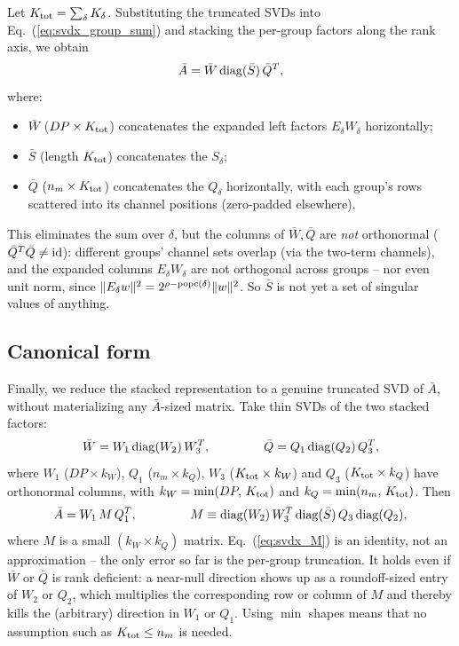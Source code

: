 \documentclass{article}
\numberwithin{equation}{section}   %
\begin{document}
Let $K_{\rm tot} = \sum_\delta K_\delta$. Substituting the truncated SVDs into
Eq.\ (\ref{eq:svdx_group_sum}) and stacking the per-group factors along the rank axis, we obtain
\begin{equation}
\bar A = \bar W \, {\rm diag}(\bar S) \, \bar Q^T,
\label{eq:svdx_stacked}
\end{equation}
where:
\begin{itemize}
\item $\bar W$ ($DP \times K_{\rm tot}$) concatenates the expanded left factors
$E_\delta W_\delta$ horizontally;
\item $\bar S$ (length $K_{\rm tot}$) concatenates the $S_\delta$;
\item $\bar Q$ ($n_m \times K_{\rm tot}$) concatenates the $Q_\delta$ horizontally, with each
group's rows scattered into its channel positions (zero-padded elsewhere).
\end{itemize}
This eliminates the sum over $\delta$, but the columns of $\bar W, \bar Q$ are {\em not}
orthonormal ($\bar Q^T \bar Q \ne {\rm id}$): different groups' channel sets overlap (via the
two-term channels), and the expanded columns $E_\delta W_\delta$ are not orthogonal across
groups -- nor even unit norm, since
$\|E_\delta w\|^2 = 2^{\rho-{\rm popc}(\delta)}\|w\|^2$. So $\bar S$ is not yet a set of
singular values of anything.

\subsection{Canonical form}
\label{ssec:svd_exact_canonical}

Finally, we reduce the stacked representation to a genuine truncated SVD of $\bar A$, without
materializing any $\bar A$-sized matrix. Take thin SVDs of the two stacked factors:
\begin{equation}
\bar W = W_1 \, {\rm diag}(W_2) \, W_3^T, \hspace{1.5cm} \bar Q = Q_1 \, {\rm diag}(Q_2) \, Q_3^T,
\end{equation}
where $W_1$ ($DP \times k_W$), $Q_1$ ($n_m \times k_Q$), $W_3$ ($K_{\rm tot} \times k_W$) and
$Q_3$ ($K_{\rm tot} \times k_Q$) have orthonormal columns, with
$k_W = \min(DP,\, K_{\rm tot})$ and $k_Q = \min(n_m,\, K_{\rm tot})$. Then
\begin{equation}
\bar A = W_1 \, M \, Q_1^T,
\hspace{1.5cm}
M \equiv {\rm diag}(W_2) \, W_3^T \, {\rm diag}(\bar S) \, Q_3 \, {\rm diag}(Q_2),
\label{eq:svdx_M}
\end{equation}
where $M$ is a small $(k_W \times k_Q)$ matrix. Eq.\ (\ref{eq:svdx_M}) is an identity, not an
approximation -- the only error so far is the per-group truncation. It holds even if $\bar W$ or
$\bar Q$ is rank deficient: a near-null direction shows up as a roundoff-sized entry of $W_2$ or
$Q_2$, which multiplies the corresponding row or column of $M$ and thereby kills the (arbitrary)
direction in $W_1$ or $Q_1$. Using $\min$ shapes means that no assumption such as
$K_{\rm tot} \le n_m$ is needed.
\end{document}
